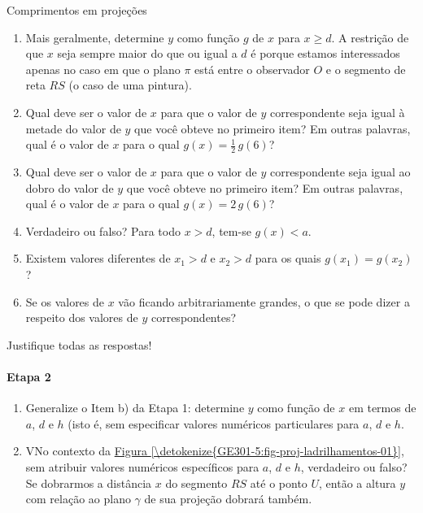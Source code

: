 \begin{task}{Comprimentos em projeções}
\begin{enumerate}
\item {} 
Mais geralmente, determine \(y\) como função \(g\) de \(x\) para \(x \geq d\). A restrição de que \(x\) seja sempre maior do que ou igual a \(d\) é porque estamos interessados apenas no caso em que o plano \(\pi\) está entre o observador \(O\) e o segmento de reta \(RS\) (o caso de uma pintura).

\item {} 
Qual deve ser o valor de \(x\) para que o valor de \(y\) correspondente seja igual à metade do valor de \(y\) que você obteve no primeiro item? Em outras palavras, qual é o valor de \(x\) para o qual \(g(x) = \frac{1}{2} \, g(6)\)?

\item {} 
Qual deve ser o valor de \(x\) para que o valor de \(y\) correspondente seja igual ao dobro do valor de \(y\) que você obteve no primeiro item? Em outras palavras, qual é o valor de \(x\) para o qual \(g(x) = 2 \, g(6)\)?

\item {} 
Verdadeiro ou falso? Para todo \(x > d\), tem-se \(g(x) < a\).

\item {} 
Existem valores diferentes de \(x_{1} > d\) e \(x_{2} > d\) para os quais \(g(x_{1}) = g(x_{2})\)?

\item {} 
Se os valores de \(x\) vão ficando arbitrariamente grandes, o que se pode dizer a respeito dos valores de \(y\) correspondentes?

\end{enumerate}

Justifique todas as respostas!

\paragraph{Etapa 2}
\begin{enumerate}
\item {} 
Generalize o Item b) da Etapa 1: determine \(y\) como função de \(x\) em termos de \(a\), \(d\) e \(h\) (isto é, sem especificar valores numéricos particulares para \(a\), \(d\) e \(h\).

\item {} 
VNo contexto da \hyperref[\detokenize{GE301-5:fig-proj-ladrilhamentos-01}]{Figura \ref{\detokenize{GE301-5:fig-proj-ladrilhamentos-01}}}, sem atribuir valores numéricos específicos para \(a\), \(d\) e \(h\), verdadeiro ou falso? Se dobrarmos a distância \(x\) do segmento \(RS\) até o ponto \(U\), então a altura \(y\) com relação ao plano \(\gamma\) de sua projeção dobrará também.


\end{enumerate}
\end{task}
